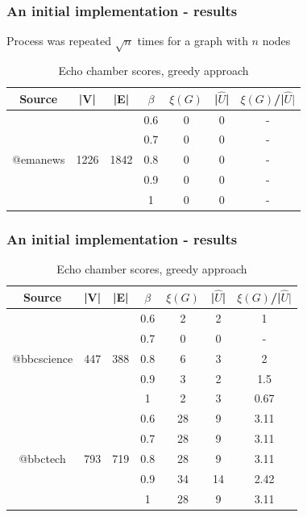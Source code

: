\documentclass{beamer}
\begin{document}
\begin{frame}[c]
    \frametitle{An initial implementation - results}
    Process was repeated $ \sqrt{n}$ times for a graph with $n$ nodes


    \begin{table}[htpb]
        \centering
        \caption{Echo chamber scores, greedy approach}
        \begin{tabular}{c|c|c|c|c|c|c}
            \textbf{Source} & {|V|} & {|E|} & $\beta $ & {$\xi(G)$} &
            {|$\hat{U}$|} & $\xi(G)$/{|$\hat{U}|$} \\
            \hline
            \multirow{5}{*}{@emanews} & \multirow{5}{*}{1226} & \multirow{5}{*}{1842} & 0.6 & 0 & 0 & - \\
                                      &  & & 0.7 & 0 & 0 & - \\
                                      &  & & 0.8 & 0 & 0 & - \\
                                      &  & & 0.9 & 0 & 0 & - \\
                                      &  & & 1 & 0 & 0 & - \\
        \end{tabular}
    \end{table}

\end{frame}

\begin{frame}[c]
    \frametitle{An initial implementation - results}
    \begin{table}[htpb]
        \centering
        \caption{Echo chamber scores, greedy approach}
        \begin{tabular}{c|c|c|c|c|c|c}
            \textbf{Source} & {|V|} & {|E|} & $\beta $ & {$\xi(G)$} &
            {|$\hat{U}$|} & $\xi(G)$/{|$\hat{U}|$} \\
            \hline
            \multirow{5}{*}{@bbcscience} & \multirow{5}{*}{447} &
            \multirow{5}{*}{388} & 0.6 & 2 & 2 & 1 \\
                                 &  & & 0.7 & 0 & 0 & - \\
                                 &  & & 0.8 & 6 & 3 & 2 \\
                                 &  & & 0.9 & 3 & 2 & 1.5 \\
                                 &  & & 1 & 2 & 3 & 0.67 \\
                                 \hline
            \multirow{5}{*}{@bbctech} & \multirow{5}{*}{793} &
            \multirow{5}{*}{719} & 0.6 & 28 & 9 & 3.11 \\
                                 &  & & 0.7 & 28 & 9 & 3.11 \\
                                 &  & & 0.8 & 28 & 9 & 3.11 \\
                                 &  & & 0.9 & 34 & 14 & 2.42 \\
                                 &  & & 1 & 28 & 9 & 3.11 \\
        \end{tabular}
    \end{table}
\end{frame}
\end{document}

